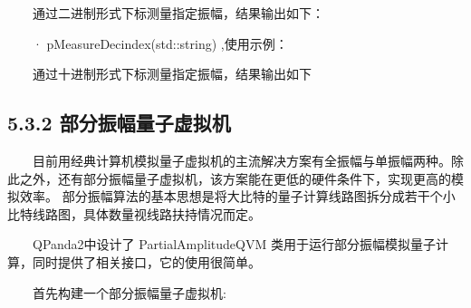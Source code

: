 \documentclass[a4paper,11pt,english]{sphinxmanual}
\begin{document}
\sphinxAtStartPar
  通过二进制形式下标测量指定振幅，结果输出如下：

\begin{sphinxVerbatim}[commandchars=\\\{\}]
\end{sphinxVerbatim}

\sphinxAtStartPar
  · pMeasureDecindex(std::string) ,使用示例：

\begin{sphinxVerbatim}[commandchars=\\\{\}]
   
    
\end{sphinxVerbatim}

\sphinxAtStartPar
  通过十进制形式下标测量指定振幅，结果输出如下

\begin{sphinxVerbatim}[commandchars=\\\{\}]
\end{sphinxVerbatim}


\subsection{5.3.2 部分振幅量子虚拟机}
\label{\detokenize{rst/5.3_u4f7f_u7528_u5355_u632f_u5e45_u548c_u90e8_u5206_u632f_u5e45_u91cf_u5b50_u865a_u62df_u673a:id3}}
\sphinxAtStartPar
  目前用经典计算机模拟量子虚拟机的主流解决方案有全振幅与单振幅两种。除此之外，还有部分振幅量子虚拟机，该方案能在更低的硬件条件下，实现更高的模拟效率。 部分振幅算法的基本思想是将大比特的量子计算线路图拆分成若干个小比特线路图，具体数量视线路扶持情况而定。

\sphinxAtStartPar
{}

\sphinxAtStartPar
  QPanda2中设计了 PartialAmplitudeQVM 类用于运行部分振幅模拟量子计算，同时提供了相关接口，它的使用很简单。

\sphinxAtStartPar
  首先构建一个部分振幅量子虚拟机:

\begin{sphinxVerbatim}[commandchars=\\\{\}]
    
\end{sphinxVerbatim}
\end{document}

